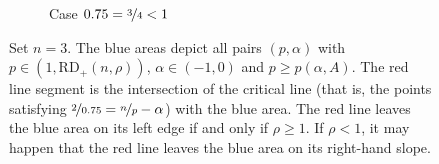 \documentclass[11pt, leqno]{amsart}
\theoremstyle{definition}
\newcommand{\RD}{\mathrm{RD}}
\begin{document}
\begin{figure}[t]
\begin{subfigure}{0.48\textwidth}
			\caption*{Case $\rho = \nicefrac{3}{4} < 1$}
		\end{subfigure}%

		\caption{Set $n = 3$. The blue areas depict all pairs $(p,\alpha)$ with $p \in (1,\RD_{+}(n,\rho))$, $\alpha \in (-1,0)$ and $p \geq p(\alpha,A)$. The red line segment is the intersection of the critical line (that is, the points satisfying $\nicefrac{2}{\rho} = \nicefrac{n}{p} - \alpha$) with the blue area. The red line leaves the blue area on its left edge if and only if $\rho \geq 1$. If $\rho < 1$, it may happen that the red line leaves the blue area on its right-hand slope.}
		\label{fig:line-rect-cases}
	\end{figure}
\end{document}
